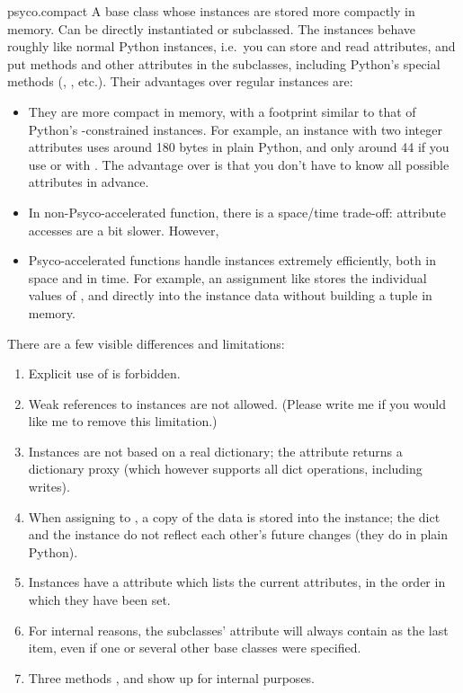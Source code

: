 \documentclass{manual}
\begin{document}
\begin{classdesc*}{psyco.compact}
A base class whose instances are stored more compactly in memory.  Can be directly instantiated or subclassed.  The instances behave roughly like normal Python instances, i.e.\ you can store and read attributes, and put methods and other attributes in the subclasses, including Python's special methods (, , etc.). Their advantages over regular instances are:
%
\begin{itemize}
\item They are more compact in memory, with a footprint similar to that of Python's -constrained instances.  For example, an instance with two integer attributes uses around 180 bytes in plain Python, and only around 44 if you use  or with .  The advantage over  is that you don't have to know all possible attributes in advance.
\item In non-Psyco-accelerated function, there is a space/time trade-off: attribute accesses are a bit slower.  However,
\item Psyco-accelerated functions handle  instances extremely efficiently, both in space and in time.  For example, an assignment like  stores the individual values of ,  and  directly into the instance data without building a tuple in memory.
\end{itemize}

There are a few visible differences and limitations:
%
\begin{enumerate}
\item Explicit use of  is forbidden.
\item Weak references to instances are not allowed.  (Please write me if you would like me to remove this limitation.)
\item Instances are not based on a real dictionary; the  attribute returns a dictionary proxy (which however supports all dict operations, including writes).
\item When assigning to , a copy of the data is stored into the instance; the dict and the instance do not reflect each other's future changes (they do in plain Python).
\item Instances have a  attribute which lists the current attributes, in the order in which they have been set.
\item For internal reasons, the subclasses'  attribute will always contain  as the last item, even if one or several other base classes were specified.
\item Three methods ,  and  show up for internal purposes.
\end{enumerate}
\end{classdesc*}
\end{document}
